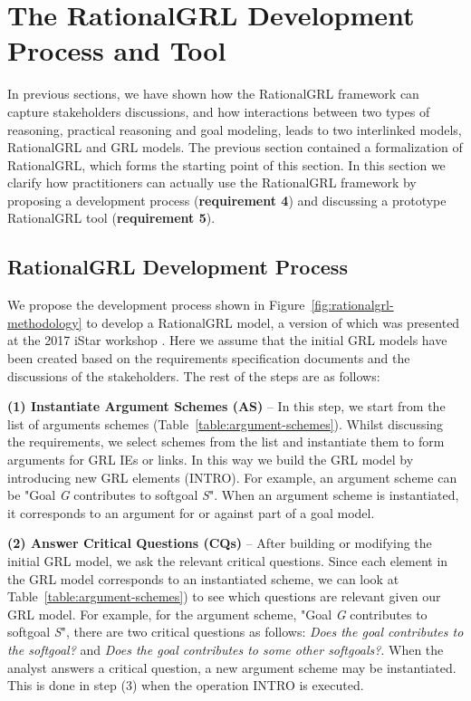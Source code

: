 \section{The RationalGRL Development Process and Tool}
\label{sect:methodology+tool}

In previous sections, we have shown how the RationalGRL framework can capture stakeholders discussions, and how interactions between two types of reasoning, practical reasoning and goal modeling, leads to two interlinked models, RationalGRL and GRL models. The previous section contained a formalization of RationalGRL, which forms the starting point of this section. In this section we clarify how practitioners can actually use the RationalGRL framework by proposing a development process (\textbf{requirement 4}) and discussing a prototype RationalGRL tool (\textbf{requirement 5}).

\subsection{RationalGRL Development Process}
\label{sect:methodology} 

We propose the development process shown in Figure~\ref{fig:rationalgrl-methodology} to develop a RationalGRL model, a version of which was presented at the 2017 iStar workshop \cite{ghanavatiMethodology}. Here we assume that the initial GRL models have been created based on the requirements specification documents and the discussions of the stakeholders. The rest of the steps are as follows:

\textbf{(1) Instantiate Argument Schemes (AS)} -- In this step, we start from the list of arguments schemes (Table~\ref{table:argument-schemes}). Whilst discussing the requirements, we select schemes from the list and instantiate them to form arguments for GRL IEs or links. In this way we build the GRL model by introducing new GRL elements (\textsf{INTRO}). For example, an argument scheme can be "Goal \emph{G} contributes to softgoal \emph{S}". When an argument scheme is instantiated, it corresponds to an argument for or against part of a goal model.

\textbf{(2) Answer Critical Questions (CQs)} -- After building or modifying the initial GRL model, we ask the relevant critical questions. Since each element in the GRL model corresponds to an instantiated scheme, we can look at Table~\ref{table:argument-schemes}) to see which questions are relevant given our GRL model. For example, for the argument scheme, "Goal \emph{G} contributes to softgoal \emph{S}", there are two critical questions as follows:  \emph{Does the goal contributes to the softgoal?} and \emph{Does the goal contributes to some other softgoals?}. When the analyst answers  a critical question, a new argument scheme may be instantiated. This is done in step (3) when the operation INTRO is executed.

